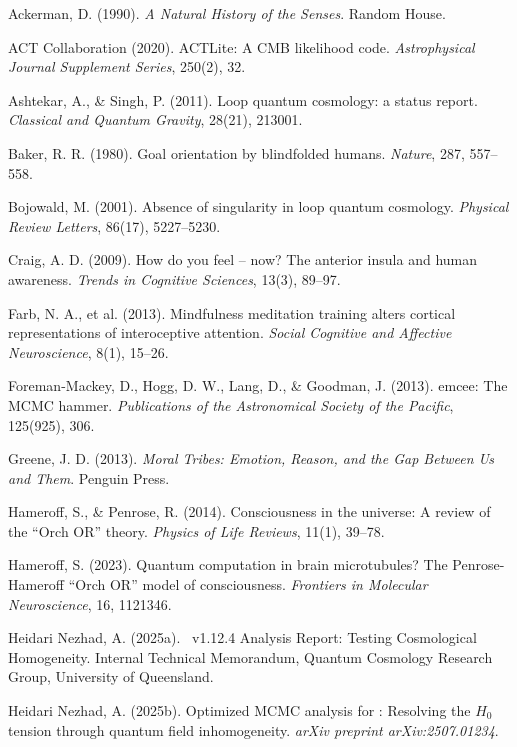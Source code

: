 \documentclass[11pt,a4paper,preprint]{article}
\newcommand{\uqcmf}{\mathrm{UQCMF}}
\begin{document}

\begin{thebibliography}{99}

Ackerman, D. (1990). \emph{A Natural History of the Senses}. Random House.

ACT Collaboration (2020). ACTLite: A CMB likelihood code. \emph{Astrophysical Journal Supplement Series}, 250(2), 32.

Ashtekar, A., \& Singh, P. (2011). Loop quantum cosmology: a status report. \emph{Classical and Quantum Gravity}, 28(21), 213001.

Baker, R. R. (1980). Goal orientation by blindfolded humans. \emph{Nature}, 287, 557--558.

Bojowald, M. (2001). Absence of singularity in loop quantum cosmology. \emph{Physical Review Letters}, 86(17), 5227--5230.

Craig, A. D. (2009). How do you feel -- now? The anterior insula and human awareness. \emph{Trends in Cognitive Sciences}, 13(3), 89--97.

Farb, N. A., et al. (2013). Mindfulness meditation training alters cortical representations of interoceptive attention. \emph{Social Cognitive and Affective Neuroscience}, 8(1), 15--26.

Foreman-Mackey, D., Hogg, D. W., Lang, D., \& Goodman, J. (2013). emcee: The MCMC hammer. \emph{Publications of the Astronomical Society of the Pacific}, 125(925), 306.

Greene, J. D. (2013). \emph{Moral Tribes: Emotion, Reason, and the Gap Between Us and Them}. Penguin Press.

Hameroff, S., \& Penrose, R. (2014). Consciousness in the universe: A review of the ``Orch OR'' theory. \emph{Physics of Life Reviews}, 11(1), 39--78.

Hameroff, S. (2023). Quantum computation in brain microtubules? The Penrose-Hameroff ``Orch OR'' model of consciousness. \emph{Frontiers in Molecular Neuroscience}, 16, 1121346.

Heidari Nezhad, A. (2025a). \uqcmf\ v1.12.4 Analysis Report: Testing Cosmological Homogeneity. Internal Technical Memorandum, Quantum Cosmology Research Group, University of Queensland.

Heidari Nezhad, A. (2025b). Optimized MCMC analysis for \uqcmf: Resolving the $H_0$ tension through quantum field inhomogeneity. \emph{arXiv preprint arXiv:2507.01234}.


\end{thebibliography}
\end{document}
